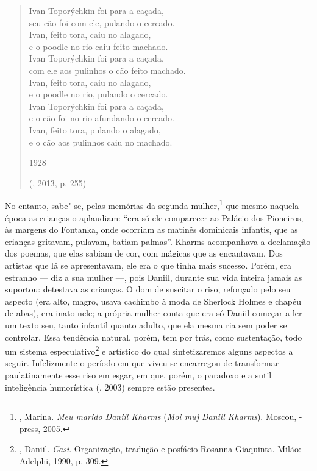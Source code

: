 \begin{verse} 
Ivan Toporýchkin foi para a caçada,\\
seu cão foi com ele, pulando o cercado.\\
Ivan, feito tora, caiu no alagado,\\
e o poodle no rio caiu feito machado.\\[8pt]
Ivan Toporýchkin foi para a caçada,\\
com ele aos pulinhos o cão feito machado.\\
Ivan, feito tora, caiu no alagado,\\
e o poodle no rio, pulando o cercado.\\[8pt]
Ivan Toporýchkin foi para a caçada,\\
e o cão foi no rio afundando o cercado.\\
Ivan, feito tora, pulando o alagado,\\
e o cão aos pulinhos caiu no machado.

1928

(, 2013, p. 255)
\end{verse}

No entanto, sabe"-se, pelas memórias da segunda mulher,\footnote{, Marina. \emph{Meu marido Daniil Kharms} (\emph{Moi muj Daniil Kharms}). Moscou, -press, 2005.} que mesmo naquela época as crianças o aplaudiam: ``era só ele comparecer ao Palácio dos Pioneiros, às margens do Fontanka, onde ocorriam as matinês dominicais infantis, que as crianças gritavam, pulavam, batiam palmas''. Kharms acompanhava a declamação dos poemas, que elas sabiam de cor, com mágicas que as encantavam. Dos artistas que lá se apresentavam, ele era o que tinha mais sucesso. Porém, era estranho --- diz a sua mulher ---, pois Daniil, durante sua vida inteira jamais as suportou: detestava as crianças. O dom de suscitar o riso, reforçado pelo seu aspecto (era alto, magro, usava cachimbo à moda de Sherlock Holmes e chapéu de abas), era inato nele; a própria mulher conta que era só Daniil começar a ler um texto seu, tanto infantil quanto adulto, que ela mesma ria sem poder se controlar. Essa tendência natural, porém, tem por trás, como sustentação, todo um sistema especulativo\footnote{, Daniil. \emph{Casi}. Organização, tradução e posfácio Rosanna Giaquinta. Milão: Adelphi, 1990, p. 309.} e artístico do qual sintetizaremos alguns aspectos a seguir. Infelizmente o período em que viveu se encarregou de transformar paulatinamente esse riso em esgar, em que, porém, o paradoxo e a sutil inteligência humorística (, 2003) sempre estão presentes.

